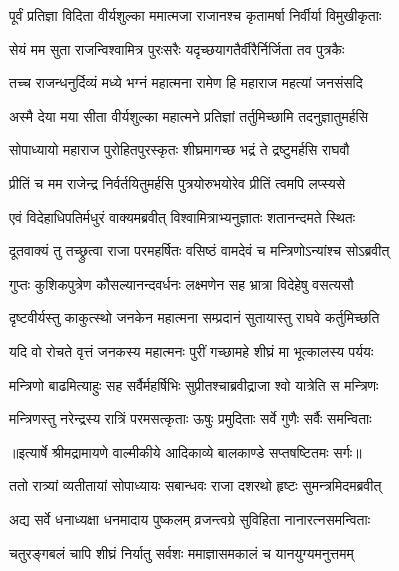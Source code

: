 \twolineshloka
{पूर्वं प्रतिज्ञा विदिता वीर्यशुल्का ममात्मजा}
{राजानश्च कृतामर्षा निर्वीर्या विमुखीकृताः} %

\twolineshloka
{सेयं मम सुता राजन्विश्वामित्र पुरःसरैः}
{यदृच्छयागतैर्वीरैर्निर्जिता तव पुत्रकैः} %

\twolineshloka
{तच्च राजन्धनुर्दिव्यं मध्ये भग्नं महात्मना}
{रामेण हि महाराज महत्यां जनसंसदि} %

\twolineshloka
{अस्मै देया मया सीता वीर्यशुल्का महात्मने}
{प्रतिज्ञां तर्तुमिच्छामि तदनुज्ञातुमर्हसि} %

\twolineshloka
{सोपाध्यायो महाराज पुरोहितपुरस्कृतः}
{शीघ्रमागच्छ भद्रं ते द्रष्टुमर्हसि राघवौ} %

\twolineshloka
{प्रीतिं च मम राजेन्द्र निर्वर्तयितुमर्हसि}
{पुत्रयोरुभयोरेव प्रीतिं त्वमपि लप्स्यसे} %

\twolineshloka
{एवं विदेहाधिपतिर्मधुरं वाक्यमब्रवीत्}
{विश्वामित्राभ्यनुज्ञातः शतानन्दमते स्थितः} %

\twolineshloka
{दूतवाक्यं तु तच्छ्रुत्वा राजा परमहर्षितः}
{वसिष्ठं वामदेवं च मन्त्रिणोऽन्यांश्च सोऽब्रवीत्} %

\twolineshloka
{गुप्तः कुशिकपुत्रेण कौसल्यानन्दवर्धनः}
{लक्ष्मणेन सह भ्रात्रा विदेहेषु वसत्यसौ} %

\twolineshloka
{दृष्टवीर्यस्तु काकुत्स्थो जनकेन महात्मना}
{सम्प्रदानं सुतायास्तु राघवे कर्तुमिच्छति} %

\twolineshloka
{यदि वो रोचते वृत्तं जनकस्य महात्मनः}
{पुरीं गच्छामहे शीघ्रं मा भूत्कालस्य पर्ययः} %

\twolineshloka
{मन्त्रिणो बाढमित्याहुः सह सर्वैर्महर्षिभिः}
{सुप्रीतश्चाब्रवीद्राजा श्वो यात्रेति स मन्त्रिणः} %

\twolineshloka
{मन्त्रिणस्तु नरेन्द्रस्य रात्रिं परमसत्कृताः}
{ऊषुः प्रमुदिताः सर्वे गुणैः सर्वैः समन्विताः} %


{॥इत्यार्षे श्रीमद्रामायणे वाल्मीकीये आदिकाव्ये बालकाण्डे सप्तषष्टितमः सर्गः॥}


\twolineshloka
{ततो रात्र्यां व्यतीतायां सोपाध्यायः सबान्धवः}
{राजा दशरथो हृष्टः सुमन्त्रमिदमब्रवीत्} %

\twolineshloka
{अद्य सर्वे धनाध्यक्षा धनमादाय पुष्कलम्}
{व्रजन्त्वग्रे सुविहिता नानारत्नसमन्विताः} %

\twolineshloka
{चतुरङ्गबलं चापि शीघ्रं निर्यातु सर्वशः}
{ममाज्ञासमकालं च यानयुग्यमनुत्तमम्} %


